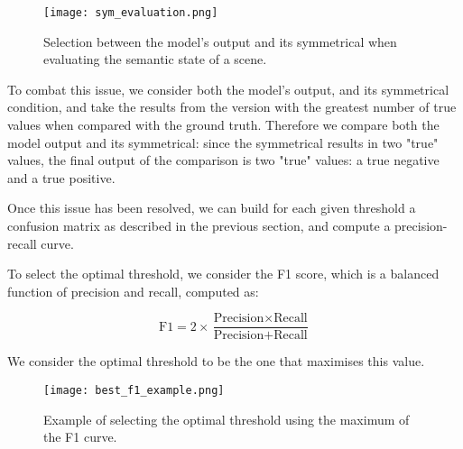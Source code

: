 \begin{figure}[ht]
    \texttt{[image: sym\_evaluation.png]}
    \caption{Selection between the model's output and its symmetrical when evaluating the semantic state of a scene.}
    \label{sym_eval}
\end{figure}

To combat this issue, we consider both the model's output, and its symmetrical condition, and take the results from the version with the greatest number of true values when compared with the ground truth. Therefore we compare both the model output and its symmetrical: since the symmetrical results in two "true" values, the final output of the comparison is two "true" values: a true negative and a true positive.

Once this issue has been resolved, we can build for each given threshold a confusion matrix as described in the previous section, and compute a precision-recall curve.

To select the optimal threshold, we consider the F1 score, which is a balanced function of precision and recall, computed as:

\begin{equation*}
    \text{F1} = 2\times\frac{\text{Precision}\times\text{Recall}}{\text{Precision}+\text{Recall}}
\end{equation*}

We consider the optimal threshold to be the one that maximises this value.

\begin{figure}[ht]
    \texttt{[image: best\_f1\_example.png]}
    \caption{Example of selecting the optimal threshold using the maximum of the F1 curve.}
\end{figure}
